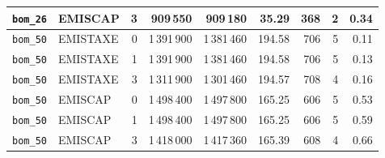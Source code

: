 \begin{table}[!htbp]
{\begin{tabular}{@{}llrrrrrrr@{}}
\texttt{bom\_26} & EMISCAP & 3 & 909\,550 & 909\,180 & 35.29 & 368 & 2 & 0.34\\
\midrule
\texttt{bom\_50} & EMISTAXE & 0 & 1\,391\,900 & 1\,381\,460 & 194.58 & 706 & 5 & 0.11\\
\texttt{bom\_50} & EMISTAXE & 1 & 1\,391\,900 & 1\,381\,460 & 194.58 & 706 & 5 & 0.13\\
\texttt{bom\_50} & EMISTAXE & 3 & 1\,311\,900 & 1\,301\,460 & 194.57 & 708 & 4 & 0.16\\
\texttt{bom\_50} & EMISCAP & 0 & 1\,498\,400 & 1\,497\,800 & 165.25 & 606 & 5 & 0.53\\
\texttt{bom\_50} & EMISCAP & 1 & 1\,498\,400 & 1\,497\,800 & 165.25 & 606 & 5 & 0.59\\
\texttt{bom\_50} & EMISCAP & 3 & 1\,418\,000 & 1\,417\,360 & 165.39 & 608 & 4 & 0.66\\
\bottomrule
\end{tabular}
}
\end{table}

